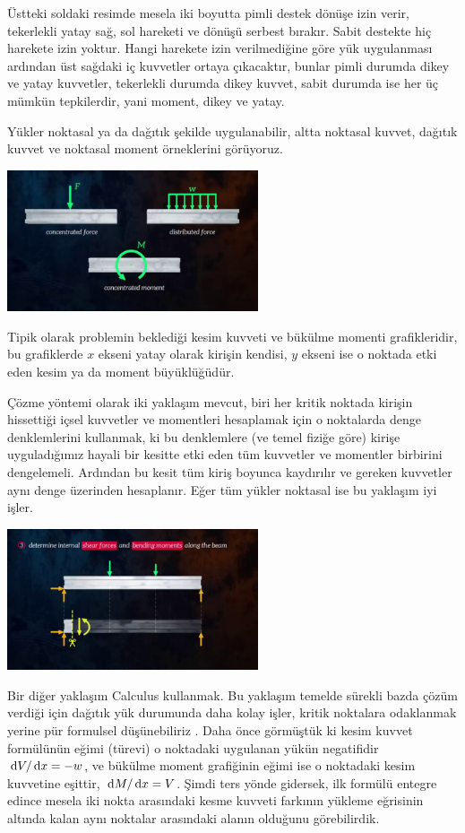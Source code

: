 \documentclass[12pt,fleqn]{article}\usepackage{../../common}
\begin{document}
Üstteki soldaki resimde mesela iki boyutta pimli destek dönüşe izin verir,
tekerlekli yatay sağ, sol hareketi ve dönüşü serbest bırakır. Sabit destekte hiç
harekete izin yoktur. Hangi harekete izin verilmediğine göre yük uygulanması
ardından üst sağdaki iç kuvvetler ortaya çıkacaktır, bunlar pimli durumda dikey
ve yatay kuvvetler, tekerlekli durumda dikey kuvvet, sabit durumda ise her üç
mümkün tepkilerdir, yani moment, dikey ve yatay.

Yükler noktasal ya da dağıtık şekilde uygulanabilir, altta noktasal kuvvet,
dağıtık kuvvet ve noktasal moment örneklerini görüyoruz.

\includegraphics[width=20em]{phy_020_strs_02_07.jpg}

Tipik olarak problemin beklediği kesim kuvveti ve bükülme momenti grafikleridir,
bu grafiklerde $x$ ekseni yatay olarak kirişin kendisi, $y$ ekseni ise o noktada
etki eden kesim ya da moment büyüklüğüdür.

Çözme yöntemi olarak iki yaklaşım mevcut, biri her kritik noktada kirişin
hissettiği içsel kuvvetler ve momentleri hesaplamak için o noktalarda denge
denklemlerini kullanmak, ki bu denklemlere (ve temel fiziğe göre) kirişe
uyguladığımız hayali bir kesitte etki eden tüm kuvvetler ve momentler birbirini
dengelemeli. Ardından bu kesit tüm kiriş boyunca kaydırılır ve gereken kuvvetler
aynı denge üzerinden hesaplanır. Eğer tüm yükler noktasal ise bu yaklaşım iyi
işler.

\includegraphics[width=20em]{phy_020_strs_02_06.jpg}

Bir diğer yaklaşım Calculus kullanmak. Bu yaklaşım temelde sürekli bazda çözüm
verdiği için dağıtık yük durumunda daha kolay işler, kritik noktalara odaklanmak
yerine pür formulsel düşünebiliriz . Daha önce görmüştük ki kesim kuvvet
formülünün eğimi (türevi) o noktadaki uygulanan yükün negatifidir $\,\mathrm{d} V / \,\mathrm{d} x
= -w$, ve bükülme moment grafiğinin eğimi ise o noktadaki kesim kuvvetine
eşittir, $\,\mathrm{d} M / \,\mathrm{d} x = V$. Şimdi ters yönde gidersek, ilk formülü entegre
edince mesela iki nokta arasındaki kesme kuvveti farkının yükleme eğrisinin
altında kalan aynı noktalar arasındaki alanın olduğunu görebilirdik.
\end{document}
